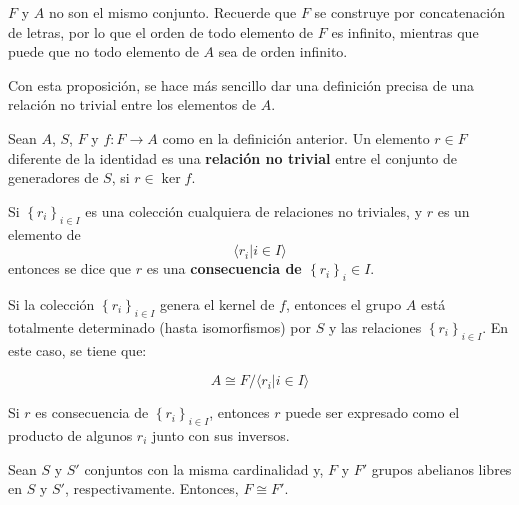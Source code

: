 \documentclass[12pt]{report}
\newcounter{it}
\theoremstyle{largebreak}
\newcommand\cf[3]{\ensuremath{#1:#2\rightarrow#3}}
\begin{document}
    \begin{obs}
        $F$ y $A$ no son el mismo conjunto. Recuerde que $F$ se construye por concatenación de letras, por lo que el orden de todo elemento de $F$ es infinito, mientras que puede que no todo elemento de $A$ sea de orden infinito.
    \end{obs}

    Con esta proposición, se hace más sencillo dar una definición precisa de una relación no trivial entre los elementos de $A$.

    \begin{mydef}
        Sean $A$, $S$, $F$ y $\cf{f}{F}{A}$ como en la definición anterior. Un elemento $r\in F$ diferente de la identidad es una \textbf{relación no trivial} entre el conjunto de generadores de $S$, si $r\in\ker f$.

        Si $\left\{r_i \right\}_{ i\in I}$ es una colección cualquiera de relaciones no triviales, y $r$ es un elemento de
        \begin{equation*}
            \langle r_i\Big|i\in I \rangle
        \end{equation*}
        entonces se dice que $r$ es una \textbf{consecuencia de $\left\{r_i \right\}_i\in I$}.
    \end{mydef}

    Si la colección $\left\{r_i \right\}_{ i\in I}$ genera el kernel de $f$, entonces el grupo $A$ está totalmente determinado (hasta isomorfismos) por $S$ y las relaciones $\left\{ r_i \right\}_{ i\in I}$. En este caso, se tiene que:
    
    \begin{equation*}
        A\cong F/\langle r_i\Big|i\in I \rangle
    \end{equation*}

    \begin{obs}
        Si $r$ es consecuencia de $\left\{r_i \right\}_{ i\in I}$, entonces $r$ puede ser expresado como el producto de algunos $r_i$ junto con sus inversos.
    \end{obs}

    \begin{propo}
        Sean $S$ y $S'$ conjuntos con la misma cardinalidad y, $F$ y $F'$ grupos abelianos libres en $S$ y $S'$, respectivamente. Entonces, $F\cong F'$.
    \end{propo}
\end{document}
